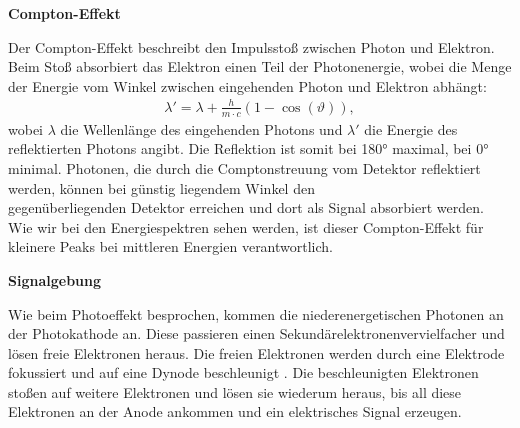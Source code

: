 \documentclass[%
aps,
onecolumn,
11pt,
tightenlines,
nofootinbib,
superscriptaddress,
floatfix,
prd,
]{revtex4-2}
\begin{document}
\textbf{Compton-Effekt}\par
Der Compton-Effekt beschreibt den Impulsstoß zwischen Photon und Elektron. Beim Stoß absorbiert das Elektron einen Teil der Photonenergie, wobei die Menge der Energie vom Winkel zwischen eingehenden Photon und Elektron abhängt:
\begin{align*}
	\lambda ' = \lambda + \frac{h}{m\cdot c} \left( 1-\cos (\vartheta) \right),
\end{align*}
wobei $\lambda$ die Wellenlänge des eingehenden Photons und $\lambda '$ die Energie des reflektierten Photons angibt. Die Reflektion ist somit bei 180° maximal, bei 0° minimal. Photonen, die durch die Comptonstreuung vom Detektor reflektiert werden, können bei günstig liegendem Winkel den \\ gegenüberliegenden Detektor erreichen und dort als Signal absorbiert werden. Wie wir bei den Energiespektren sehen werden, ist dieser Compton-Effekt für kleinere Peaks bei mittleren Energien verantwortlich.\vspace{15pt}\par
\textbf{Signalgebung}\par
Wie beim Photoeffekt besprochen, kommen die niederenergetischen Photonen an der Photokathode an. Diese passieren einen Sekundärelektronenvervielfacher und lösen freie Elektronen heraus. Die freien Elektronen werden durch eine Elektrode fokussiert und auf eine Dynode beschleunigt \cite{manual1}. Die beschleunigten Elektronen stoßen auf weitere Elektronen und lösen sie wiederum heraus, bis all diese Elektronen an der Anode ankommen und ein elektrisches Signal erzeugen. \cite{manual1}
\end{document}

